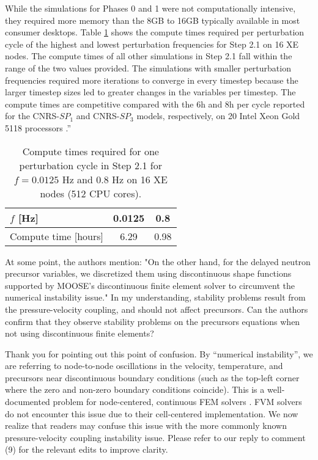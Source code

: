 \documentclass[answers,11pt]{exam}
\begin{document}
\begin{questions}
\begin{solution}
While the simulations for Phases 0 and 1 were not computationally intensive,
they required more memory than the 8GB to 16GB typically available in most
consumer desktops. Table \ref{table:compute} shows the compute times required
per perturbation cycle of the highest and lowest perturbation frequencies for
Step 2.1 on 16 XE nodes. The compute times of all other simulations in Step 2.1
fall within the range of the two values provided. The simulations with smaller
perturbation frequencies required more iterations to converge in every timestep
because the larger timestep sizes led to greater changes in the variables per
timestep. The compute times are competitive compared with the 6h and 8h per
cycle reported for the CNRS-$SP_1$ and CNRS-$SP_3$ models, respectively, on 20
Intel\textsuperscript{\tiny\textregistered}
Xeon\textsuperscript{\tiny\textregistered} Gold 5118 processors
\cite{blanco_neutronic_2021,blanco_neutronic_2020}.''
        \end{solution}
        \begin{table}[htb]
	\caption{Compute times required for one perturbation cycle in Step 2.1 for
	$f=0.0125$ Hz and $0.8$ Hz on 16 XE nodes (512 CPU cores).}
	\centering
	\small
	\setlength\tabcolsep{1.5pt}
	\begin{tabular}{l c c}
		\toprule
		$f$ [Hz] & 0.0125 & 0.8 \\
		\midrule
		Compute time [hours] & 6.29 & 0.98 \\
		\bottomrule
	\end{tabular}
	\label{table:compute}
\end{table}

        \question At some point, the authors mention:
"On the other hand, for the delayed neutron precursor variables, we discretized them using discontinuous shape functions supported by MOOSE's discontinuous finite element solver to circumvent the numerical instability issue."
In my understanding, stability problems result from the pressure-velocity coupling, and should not affect precursors. Can the authors confirm that  they observe stability problems on the precursors equations when not using discontinuous finite elements?

        \begin{solution}
        	Thank you for pointing out this point of confusion. By ``numerical
        	instability'', we are referring to node-to-node oscillations in the
        	velocity, temperature, and precursors near discontinuous
        	boundary conditions (such as the top-left corner where the zero and
        	non-zero boundary conditions coincide). This is a well-documented
        	problem for node-centered, continuous FEM solvers
        	\cite{kuhlmann_lid-driven_2018}. FVM solvers do not encounter
        	this issue due to their cell-centered implementation. We now
        	realize that readers may confuse this issue with the more commonly
        	known pressure-velocity coupling instability issue. Please refer to
        	our reply to comment (9) for the relevant edits to improve clarity.
        \end{solution}


\end{questions}
\end{document}
